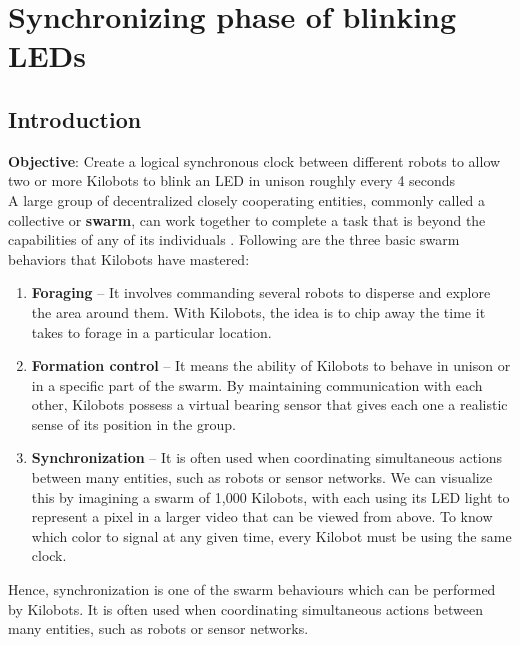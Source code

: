 \chapter{Synchronizing phase of blinking LEDs}
\section{Introduction}
\textbf{Objective}: Create a logical synchronous clock between different 
robots to allow two or more Kilobots to blink an LED in unison roughly every 4 seconds \\

\noindent A large group of decentralized closely cooperating entities, commonly called a collective or \textbf{swarm}, can work together to complete a task that is beyond the capabilities of any of its individuals \cite{rubenstein2014kilobot}. Following are the three basic swarm behaviors \cite{rubenstein2014kilobot} that Kilobots have mastered: 
\begin{enumerate}
	\item  \textbf{Foraging} -- It involves commanding several robots to disperse and explore the area around them. With Kilobots, the idea is to chip away the time it takes to forage in a particular location. 
	\item  \textbf{Formation control} -- It means the ability of Kilobots to behave in unison or in a specific part of the swarm. By maintaining communication with each other, Kilobots possess a virtual bearing sensor that gives each one a realistic sense of its position in the group. 
	\item \textbf{Synchronization} -- It is often used when coordinating simultaneous actions between many entities, such as robots or sensor networks. We can  visualize this by imagining a swarm of 1,000 Kilobots, with each using its LED light to represent a pixel in a larger video that can be viewed from above. To know which color to signal at any given time, every Kilobot must be using the same clock.
\end{enumerate}
Hence, synchronization is one of the swarm behaviours which can be performed by Kilobots. It is often used when coordinating simultaneous
actions between many entities, such as robots or sensor networks.\\


